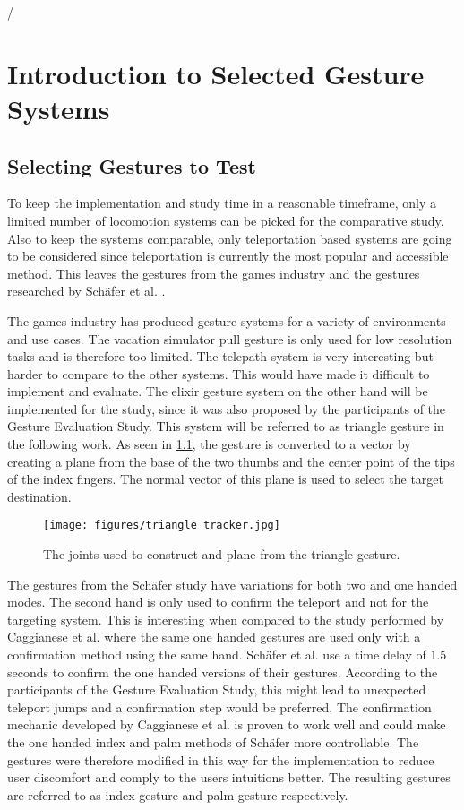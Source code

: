 /\chapter{Introduction to Selected Gesture Systems} %
\label{cha:Introduction to Selected Gesture Systems}

\section{Selecting Gestures to Test}

To keep the implementation and study time in a reasonable timeframe, only a limited number of locomotion systems can be picked for the comparative study. Also to keep the systems comparable, only teleportation based systems are going to be considered since teleportation is currently the most popular and accessible method. This leaves the gestures from the games industry and the gestures researched by Schäfer et al. \cite{Schafer2021}. 

The games industry has produced gesture systems for a variety of environments and use cases. The vacation simulator pull gesture is only used for low resolution tasks and is therefore too limited. The telepath system is very interesting but harder to compare to the other systems. This would have made it difficult to implement and evaluate. %
The elixir gesture system on the other hand will be implemented for the study, since it was also proposed by the participants of the Gesture Evaluation Study.  %
This system will be referred to as triangle gesture in the following work. As seen in \ref{fig:triangleTracker}, the gesture is converted to a vector by creating a plane from the base of the two thumbs and the center point of the tips of the index fingers. The normal vector of this plane is used to select the target destination.

\begin{figure}[!ht]
    \centering
    \texttt{[image: figures/triangle tracker.jpg]}
    \caption{The joints used to construct and plane from the triangle gesture.}
    \label{fig:triangleTracker}
\end{figure}

The gestures from the Schäfer study have variations for both two and one handed modes. The second hand is only used to confirm the teleport and not for the targeting system. 
This is interesting when compared to the study performed by Caggianese et al. \cite{Caggianese} where the same one handed gestures are used only with a confirmation method using the same hand. Schäfer et al. use a time delay of $1.5$ seconds to confirm the one handed versions of their gestures. According to the participants of the Gesture Evaluation Study, this might lead to unexpected teleport jumps and a confirmation step would be preferred. The confirmation mechanic developed by Caggianese et al. is proven to work well and could make the one handed index and palm methods of Schäfer more controllable. The gestures were therefore modified in this way for the implementation to reduce user discomfort and comply to the users intuitions better. The resulting gestures are referred to as index gesture and palm gesture respectively. 

